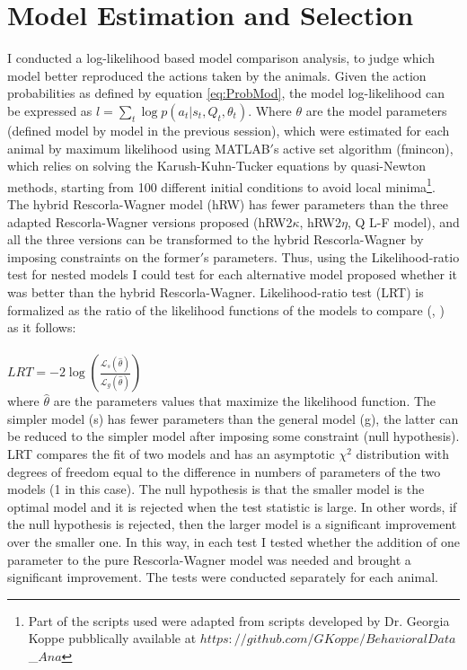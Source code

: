 \section{Model Estimation and Selection}
\label{sec:Behavior}
I conducted a log-likelihood based model comparison analysis, to judge which model better reproduced the actions taken by the animals. Given the action probabilities as defined by equation \ref{eq:ProbMod}, the model log-likelihood can be expressed as $l=\sum_{t} \log p(a_t|s_t,Q_t,\theta_t)$. Where $\theta$ are the model parameters (defined model by model in the previous session), which were estimated for each animal by maximum likelihood using MATLAB$'$s active set algorithm (fmincon), which relies on solving the Karush-Kuhn-Tucker equations by quasi-Newton methods, starting from 100 different initial conditions to avoid local minima\footnote{Part of the scripts used were adapted from scripts developed by Dr. Georgia Koppe pubblically available at $https:// github.com/GKoppe/BehavioralData$\_$Ana$}.\\The hybrid Rescorla-Wagner model (hRW) has fewer parameters than the three adapted Rescorla-Wagner versions proposed (hRW2$\kappa$, hRW2$\eta$, Q L-F model), and all the three versions can be transformed to the hybrid Rescorla-Wagner by imposing constraints on the former$'$s parameters. Thus, using the Likelihood-ratio test for nested models I could test for each alternative model proposed whether it was better than the hybrid Rescorla-Wagner. Likelihood-ratio test (LRT) is formalized as the ratio of the likelihood functions of the models to compare (\cite{NeymanPearson}, \cite{King}) as it follows:\\\\
 \hspace{5cm} $LRT = -2 \log (\frac{\mathcal{L}_s(\hat{\theta})}{\mathcal{L}_g(\hat{\theta})})$\\
where $\hat{\theta}$ are the parameters values that maximize the likelihood function. The simpler model (s) has fewer parameters than the general model (g), the latter can be reduced to the simpler model after imposing some constraint (null hypothesis).\\LRT compares the fit of two models and has an asymptotic $\chi^2$ distribution with degrees of freedom equal to the difference in numbers of parameters of the two models (1 in this case). The null hypothesis is that the smaller model is the optimal model and it is rejected when the test statistic is large. In other words, if the null hypothesis is rejected, then the larger model is a significant improvement over the smaller one. In this way, in each test I tested whether the addition of one parameter to the pure Rescorla-Wagner model was needed and brought a significant improvement. The tests were conducted separately for each animal.

